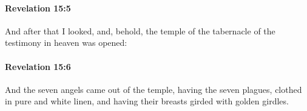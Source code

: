 		\paragraph{Revelation 15:5} %
			\label{REVELATIONNT-15-5}

			And after that I looked, and, behold, the temple of the tabernacle of the testimony in heaven was opened:

			\begin{framed}
			\scriptsize
				\begin{compactdesc}
					\item[SBLG] 
				\end{compactdesc}
			\end{framed}

		\paragraph{Revelation 15:6} %
			\label{REVELATIONNT-15-6}

			And the seven angels came out of the temple, having the seven plagues, clothed in pure and white linen, and having their breasts girded with golden girdles.

